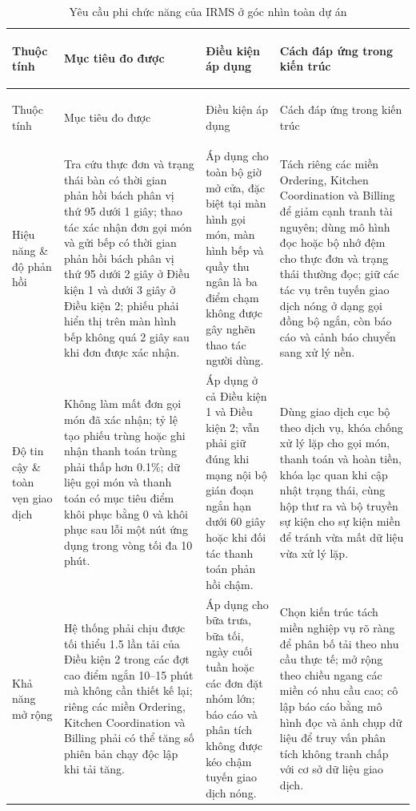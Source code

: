 \documentclass[11pt,a4paper]{article}
\begin{document}
\setlength{\LTleft}{0pt}
\setlength{\LTright}{0pt}
\small
\begin{longtable}{
  >{\bfseries\raggedright\arraybackslash}p{2.8cm}
  >{\raggedright\arraybackslash}p{4.4cm}
  >{\raggedright\arraybackslash}p{3.0cm}
  >{\raggedright\arraybackslash}p{4.2cm}
}
\caption{Yêu cầu phi chức năng của IRMS ở góc nhìn toàn dự án}\\
\toprule
Thuộc tính & Mục tiêu đo được & Điều kiện áp dụng & Cách đáp ứng trong kiến trúc \\
\midrule
\endfirsthead
\toprule
Thuộc tính & Mục tiêu đo được & Điều kiện áp dụng & Cách đáp ứng trong kiến trúc \\
\midrule
\endhead
Hiệu năng \& độ phản hồi & Tra cứu thực đơn và trạng thái bàn có thời gian phản hồi bách phân vị thứ 95 dưới 1 giây; thao tác xác nhận đơn gọi món và gửi bếp có thời gian phản hồi bách phân vị thứ 95 dưới 2 giây ở Điều kiện 1 và dưới 3 giây ở Điều kiện 2; phiếu phải hiển thị trên màn hình bếp không quá 2 giây sau khi đơn được xác nhận. & Áp dụng cho toàn bộ giờ mở cửa, đặc biệt tại màn hình gọi món, màn hình bếp và quầy thu ngân là ba điểm chạm không được gây nghẽn thao tác người dùng. & Tách riêng các miền \textsf{Ordering}, \textsf{Kitchen Coordination} và \textsf{Billing} để giảm cạnh tranh tài nguyên; dùng mô hình đọc hoặc bộ nhớ đệm cho thực đơn và trạng thái thường đọc; giữ các tác vụ trên tuyến giao dịch nóng ở dạng gọi đồng bộ ngắn, còn báo cáo và cảnh báo chuyển sang xử lý nền. \\
Độ tin cậy \& toàn vẹn giao dịch & Không làm mất đơn gọi món đã xác nhận; tỷ lệ tạo phiếu trùng hoặc ghi nhận thanh toán trùng phải thấp hơn 0.1\%; dữ liệu gọi món và thanh toán có mục tiêu điểm khôi phục bằng 0 và khôi phục sau lỗi một nút ứng dụng trong vòng tối đa 10 phút. & Áp dụng ở cả Điều kiện 1 và Điều kiện 2; vẫn phải giữ đúng khi mạng nội bộ gián đoạn ngắn hạn dưới 60 giây hoặc khi đối tác thanh toán phản hồi chậm. & Dùng giao dịch cục bộ theo dịch vụ, khóa chống xử lý lặp cho gọi món, thanh toán và hoàn tiền, khóa lạc quan khi cập nhật trạng thái, cùng hộp thư ra và bộ truyền sự kiện cho sự kiện miền để tránh vừa mất dữ liệu vừa xử lý lặp. \\
Khả năng mở rộng & Hệ thống phải chịu được tối thiểu 1.5 lần tải của Điều kiện 2 trong các đợt cao điểm ngắn 10--15 phút mà không cần thiết kế lại; riêng các miền \textsf{Ordering}, \textsf{Kitchen Coordination} và \textsf{Billing} phải có thể tăng số phiên bản chạy độc lập khi tải tăng. & Áp dụng cho bữa trưa, bữa tối, ngày cuối tuần hoặc các đơn đặt nhóm lớn; báo cáo và phân tích không được kéo chậm tuyến giao dịch nóng. & Chọn kiến trúc tách miền nghiệp vụ rõ ràng để phân bố tải theo nhu cầu thực tế; mở rộng theo chiều ngang các miền có nhu cầu cao; cô lập báo cáo bằng mô hình đọc và ảnh chụp dữ liệu để truy vấn phân tích không tranh chấp với cơ sở dữ liệu giao dịch. \\

\end{longtable}
\end{document}
